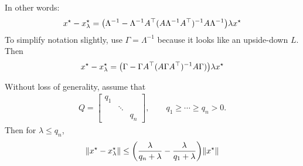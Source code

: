 \documentclass[12pt]{article}
\begin{document}
In other words:
\begin{align*}
  x^\star - x_\lambda ^\star
    = {\left(\Lambda^{-1} -
      \Lambda^{-1} A^\top (A \Lambda^{-1} A^\top)^{-1} A \Lambda^{-1}\right)}
      \lambda x^\star
\end{align*}
To simplify notation slightly, use \(\Gamma = \Lambda^{-1}\)
because it looks like an upside-down \(L\).
Then
\begin{align*}
  x^\star - x_\lambda ^\star
    = {\left(\Gamma - \Gamma A^\top (A \Gamma A^\top)^{-1} A \Gamma)\right)}
      \lambda x^\star
\end{align*}

\begin{theorem}
  Without loss of generality, assume that
  \begin{align*}
    Q = \begin{bmatrix} q_1 & & \\ & \ddots & \\ & & q_n \end{bmatrix},
      \qquad q_1 \geq \cdots \geq q_n > 0.
  \end{align*}
  Then for \(\lambda \leq q_n\),
  \begin{align*}
    {\left\lVert x^\star - x_\lambda ^\star\right\rVert}
      \leq {\left(\frac{\lambda}{q_n + \lambda}
              - \frac{\lambda}{q_1 + \lambda}\right)} {\left\lVert x^\star\right\rVert}
  \end{align*}
\end{theorem}
\end{document}
